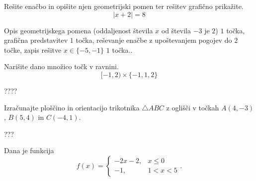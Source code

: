 \documentclass[addpoints]{exam}
\begin{document}
\begin{questions}
    



    \newpage

    \question[5]
    Rešite enačbo in opišite njen geometrijski pomen ter rešitev grafično prikažite.
    $$  \left\lvert x+2\right\rvert=8 $$
    
    
    \begin{solution}[9cm]
        Opis geometrijskega pomena (oddaljenost števila $x$ od števila $-3$ je $2$) $1$ točka, grafična predstavitev $1$ točka, reševanje enačbe z upoštevanjem pogojev do $2$ točke, zapis rešitve $x\in\{-5,-1\}$ $1$ točka..
    \end{solution}











    \question[4]
    Narišite dano množico točk v ravnini.
        $$[-1,2)\times \{-1,1,2\}$$

            \begin{solution}[7cm]
                ????
            \end{solution}

    
    
    \newpage

    \question[4]
    Izračunajte ploščino in orientacijo trikotnika $\triangle ABC$ z oglišči v točkah $A(4,-3)$, $B(5,4)$ in $C(-4,1)$.
    
    
    \begin{solution}[5cm]
        ???
    \end{solution}

        
    

    \question
    Dana je funkcija $$f(x)=\begin{cases}
    -2x-2, & x\leq 0 \\ -1, & 1<x<5
    \end{cases}.$$ 
    
\end{questions}
\end{document}
